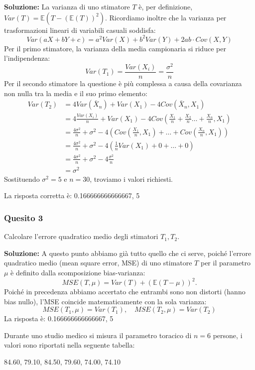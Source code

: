 \documentclass[12pt, a4paper]{article}
\begin{document}
\textbf{Soluzione:}
La varianza di uno stimatore $T$ è, per definizione, $Var(T) = \mathbb{E}(T - (\mathbb{E}(T))^2)$.
Ricordiamo inoltre che la varianza per trasformazioni lineari di variabili casuali soddisfa:
$$ Var(aX + bY + c) = a^2 Var(X) + b^2 Var(Y) + 2ab \cdot Cov(X,Y) $$
Per il primo stimatore, la varianza della media campionaria si riduce per l'indipendenza:
$$ Var(T_1) = \frac{Var(X_i)}{n} = \frac{\sigma^2}{n} $$
Per il secondo stimatore la questione è più complessa a causa della covarianza non nulla tra la media e il suo primo elemento:
$$ \begin{aligned} Var(T_2) &= 4Var(\bar{X}_n) + Var(X_1) - 4Cov(\bar{X}_n, X_1) \\ &= 4\frac{Var(X_i)}{n} + Var(X_1) - 4Cov\left(\frac{X_1}{n} + \frac{X_2}{n} \dots + \frac{X_n}{n}, X_1\right) \\ &= \frac{4\sigma^2}{n} + \sigma^2 - 4\left(Cov\left(\frac{X_1}{n}, X_1\right) + \dots + Cov\left(\frac{X_n}{n}, X_1\right)\right) \\ &= \frac{4\sigma^2}{n} + \sigma^2 - 4\left(\frac{1}{n}Var(X_1) + 0 + \dots + 0\right) \\ &= \frac{4\sigma^2}{n} + \sigma^2 - 4\frac{\sigma^2}{n} \\ &= \sigma^2 \end{aligned} $$
Sostituendo $\sigma^2 = 5$ e $n=30$, troviamo i valori richiesti.

La risposta corretta è: 0.166666666666667, 5

\subsubsection*{Quesito 3}
Calcolare l’errore quadratico medio degli stimatori $T_1, T_2$.

\textbf{Soluzione:}
A questo punto abbiamo già tutto quello che ci serve, poiché l’errore quadratico medio (mean square error, MSE) di uno stimatore $T$ per il parametro $\mu$ è definito dalla scomposizione bias-varianza: 
$$ MSE(T, \mu) = Var(T) + (\mathbb{E}(T - \mu))^2. $$
Poiché in precedenza abbiamo accertato che entrambi sono non distorti (hanno bias nullo), l'MSE coincide matematicamente con la sola varianza:
$$ MSE(T_1, \mu) = Var(T_1), \quad MSE(T_2, \mu) = Var(T_2) $$
La risposta è: 0.166666666666667, 5


\vspace{0.5cm}
\begin{tcolorbox}[colback=lightergray!10, colframe=tocsec, title=\textbf{Esercizio 13}]
Durante uno studio medico si misura il parametro toracico di $n=6$ persone, i valori sono riportati nella seguente tabella:
\begin{center}
84.60, 79.10, 84.50, 79.60, 74.00, 74.10
\end{center}
\end{tcolorbox}
\end{document}
